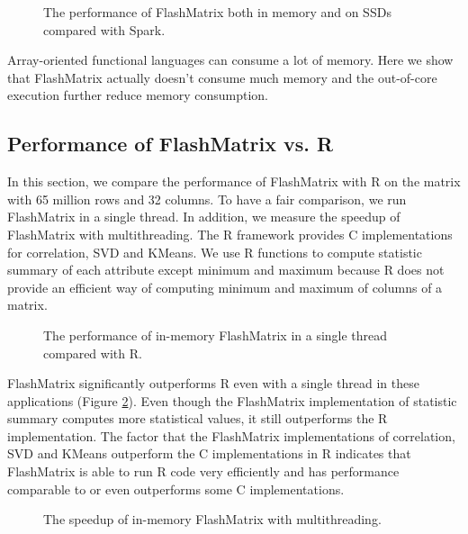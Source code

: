 \begin{figure}
	\begin{center}
		\footnotesize
		
		\caption{The performance of FlashMatrix both in memory and on SSDs
		compared with Spark.}
		\label{perf:fm}
	\end{center}
\end{figure}

Array-oriented functional languages can consume a lot of memory. Here we show
that FlashMatrix actually doesn't consume much memory and the out-of-core
execution further reduce memory consumption.

\subsection{Performance of FlashMatrix vs. R}
In this section, we compare the performance of FlashMatrix with R on the matrix
with 65 million rows and 32 columns. To have
a fair comparison, we run FlashMatrix in a single thread. In addition, we
measure the speedup of FlashMatrix with multithreading. The R framework
provides C implementations for correlation, SVD and KMeans. We use R functions
to compute statistic summary of each attribute except minimum and maximum
because R does not provide an efficient way of computing minimum and maximum
of columns of a matrix.


\begin{figure}
	\begin{center}
		\footnotesize
		
		\caption{The performance of in-memory FlashMatrix in a single thread
		compared with R.}
		\label{fig:fmR}
	\end{center}
\end{figure}

FlashMatrix significantly outperforms R even with a single thread in these
applications (Figure \ref{fig:fmR}). Even though the FlashMatrix implementation
of statistic summary computes more statistical values, it still outperforms
the R implementation. The factor that the FlashMatrix
implementations of correlation, SVD and KMeans outperform the C implementations
in R indicates that FlashMatrix is able to run R code very efficiently
and has performance comparable to or even outperforms some C implementations.

\begin{figure}
	\begin{center}
		\footnotesize
		
		\caption{The speedup of in-memory FlashMatrix with multithreading.}
		\label{fig:speedup}
	\end{center}
\end{figure}

